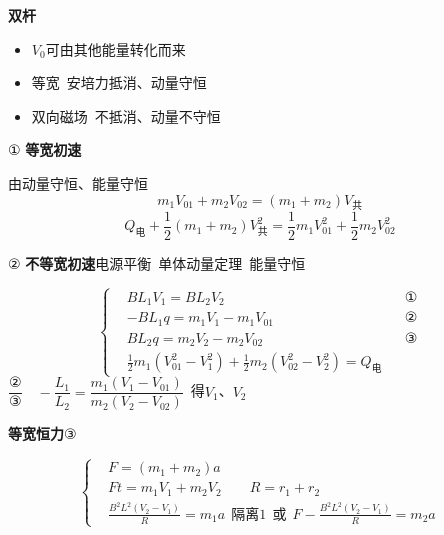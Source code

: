 \textbf{双杆}

\begin{itemize}
\item $V_0$可由其他能量转化而来
\item 等宽\ 安培力抵消、动量守恒
\item 双向磁场\ 不抵消、动量不守恒
\end{itemize}

① \textbf{等宽初速}


由动量守恒、能量守恒
\[
m_1V_{01}+m_2V_{02}=(m_1+m_2)V_{\text{共}}
\]
\[
Q_{\text{电}}+\frac12(m_1+m_2)V_{\text{共}}^2=\frac12m_1V_{01}^2+\frac12m_2V_{02}^2
\]

② \textbf{不等宽初速}\quad \textbar 电源平衡\textbar\ 单体动量定理\ \textbar 能量守恒\textbar


\[
\left\{\begin{aligned}
&BL_1V_1=BL_2V_2 && \text{①}\\
&-BL_1q=m_1V_1-m_1V_{01} && \text{②}\\
&BL_2q=m_2V_2-m_2V_{02} && \text{③}\\
&\tfrac12m_1(V_{01}^2-V_1^2)+\tfrac12m_2(V_{02}^2-V_2^2)=Q_{\text{电}}
\end{aligned}\right.
\]
$\dfrac{\text{②}}{\text{③}}\quad -\dfrac{L_1}{L_2}=\dfrac{m_1(V_1-V_{01})}{m_2(V_2-V_{02})}$\ 得$V_1$、$V_2$

\textbf{等宽恒力}\quad ③


\[
\left\{\begin{aligned}
&F=(m_1+m_2)a\\
&Ft=m_1V_1+m_2V_2\qquad R=r_1+r_2\\
&\frac{B^2L^2(V_2-V_1)}{R}=m_1a\ \ \text{隔离1}\ \ \text{或}\ \ F-\frac{B^2L^2(V_2-V_1)}{R}=m_2a
\end{aligned}\right.
\]

